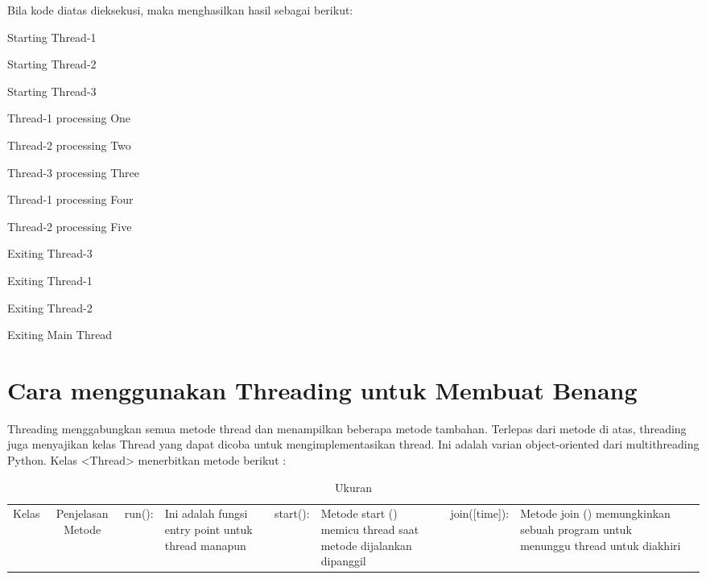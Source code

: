 \vspace{10pt} 
Bila kode diatas dieksekusi, maka menghasilkan hasil sebagai berikut: \par
\vspace{12pt}
\noindent 
{\fontsize{10pt}{10pt}\selectfont Starting Thread-1} \par
\noindent 
{\fontsize{10pt}{10pt}\selectfont Starting Thread-2} \par
\noindent 
{\fontsize{10pt}{10pt}\selectfont Starting Thread-3} \par
\noindent 
{\fontsize{10pt}{10pt}\selectfont Thread-1 processing One} \par
\noindent 
{\fontsize{10pt}{10pt}\selectfont Thread-2 processing Two} \par
\noindent 
{\fontsize{10pt}{10pt}\selectfont Thread-3 processing Three} \par
\noindent 
{\fontsize{10pt}{10pt}\selectfont Thread-1 processing Four} \par
\noindent 
{\fontsize{10pt}{10pt}\selectfont Thread-2 processing Five} \par
\noindent 
{\fontsize{10pt}{10pt}\selectfont Exiting Thread-3} \par
\noindent 
{\fontsize{10pt}{10pt}\selectfont Exiting Thread-1} \par
\noindent 
{\fontsize{10pt}{10pt}\selectfont Exiting Thread-2} \par
\noindent 
{\fontsize{10pt}{10pt}\selectfont Exiting Main Thread} \par

\section{Cara menggunakan Threading untuk Membuat Benang}
\hspace*{0.5in} Threading menggabungkan semua metode thread dan menampilkan beberapa metode tambahan. Terlepas dari metode di atas, threading juga menyajikan kelas Thread yang dapat dicoba untuk mengimplementasikan thread. Ini adalah varian object-oriented dari multithreading Python. Kelas <Thread> menerbitkan metode berikut :

\begin{table}[ht]
	\caption{Ukuran}
	\begin{tabular*}{\textwidth}{@{\extracolsep{\fill}}lcc}
		\hline
		Kelas&  Penjelasan Metode&\cr
		\hline
		run():&Ini adalah fungsi entry point untuk thread manapun&\cr
		start():&Metode start () memicu thread saat metode dijalankan dipanggil&\cr
		join([time]):&Metode join () memungkinkan sebuah program untuk menunggu thread untuk diakhiri&\cr
		\hline
	\end{tabular*}
	\begin{tablenotes}
	\end{tablenotes}
\end{table}

